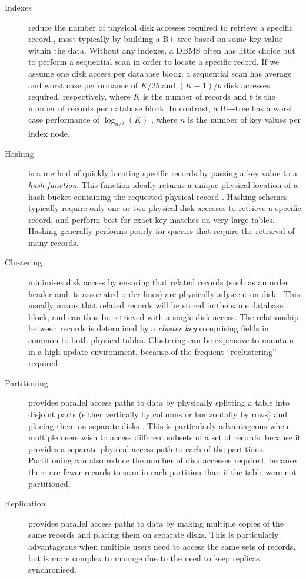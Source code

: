 \documentclass{CRPITStyle}
\begin{document}
\begin{description}

	\item[Indexes] reduce the number of physical disk accesses required
	to retrieve a specific record \cite{Roti-S-1996}, most typically by
	building a B+-tree \cite{Knut-DE-1997-Art} based on some key value
	within the data. Without any indexes, a DBMS often has little choice
	but to perform a sequential scan in order to locate a specific
	record. If we assume one disk access per database block, a
	sequential scan has average and worst case performance of \(K/2b\)
	and \((K - 1)/b\) disk accesses required, respectively, where \(K\)
	is the number of records and \(b\) is the number of records per
	database block. In contrast, a B+-tree has a worst case performance
	of \(\log_{n/2}(K)\) \cite{Silb-A-2002-4E}, where \(n\) is the
	number of key values per index node.

	\item[Hashing] is a method of quickly locating specific records by
	passing a key value to a \emph{hash function}. This function ideally
	returns a unique physical location of a hash bucket containing the
	requested physical record \cite{Pete-W-1957-hash}. Hashing schemes
	typically require only one or two physical disk accesses to retrieve
	a specific record, and perform best for exact key matches on very
	large tables. Hashing generally performs poorly for queries that
	require the retrieval of many records.

	\item[Clustering] minimises disk access by ensuring that related
	records (such as an order header and its associated order lines) are
	physically adjacent on disk \cite{Shas-DE-2003-tuning}. This usually
	means that related records will be stored in the same database
	block, and can thus be retrieved with a single disk access. The
	relationship between records is determined by a \emph{cluster key}
	comprising fields in common to both physical tables. Clustering can
	be expensive to maintain in a high update environment, because of
	the frequent ``reclustering'' required.

	\item[Partitioning] provides parallel access paths to data by
	physically splitting a table into disjoint parts (either vertically
	by columns or horizontally by rows) and placing them on separate
	disks \cite{Ceri-S-1982-partition}. This is particularly
	advantageous when multiple users wish to access different subsets of
	a set of records, because it provides a separate physical access
	path to each of the partitions. Partitioning can also reduce the
	number of disk accesses required, because there are fewer records to
	scan in each partition than if the table were not partitioned.

	\item[Replication] provides parallel access paths to data by making
	multiple copies of the same records and placing them on separate
	disks. This is particularly advantageous when multiple users need to
	access the same sets of records, but is more complex to manage due
	to the need to keep replicas synchronised.

\end{description}
\end{document}
